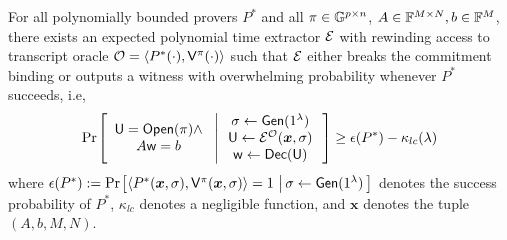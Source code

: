 
\begin{lemma}[Soundness]\label{lem:linercheck_sound}
For all polynomially bounded provers $P^\ast$ and all $\pi\in \mathbb{G}^{p\times n}$,
$A\in \mathbb{F}^{M\times N}, b\in \mathbb{F}^M$, there exists an expected polynomial time
extractor $\mathcal{E}$ with rewinding access to transcript oracle $\mathcal{O}=\langle
P^\ast(\cdot),\mathsf{V}^\pi(\cdot)\rangle$ such that $\mathcal{E}$ either breaks the 
commitment binding or outputs a witness with overwhelming probability whenever 
$P^\ast$ succeeds, i.e,
{\small
\begin{align*}
\condprob{\begin{array}{c}
\ewit=\open(\pi)\wedge \\
A\wit=b
\end{array}
}{
\begin{array}{c}
\sigma\gets \gen(\secparam) \\
\ewit\gets \extr^{\mc{O}}(\bm{x},\sigma) \\
\wit\gets \dec(\ewit)
\end{array}}\geq
\epsilon(P^\ast)-\kappa_{lc}(\secpar)
\end{align*}
}
where $\epsilon(P^\ast):= \condprob{\langle P^\ast(\bm{x},\sigma),\verifier^\pi(\bm{x},\sigma)\rangle=1}{\sigma\gets \gen(\secparam)}$ denotes the success probability of $P^\ast$, $\kappa_{lc}$ denotes a negligible function, and $\bm{x}$ denotes the tuple $(A,b,M,N)$.
\end{lemma}

